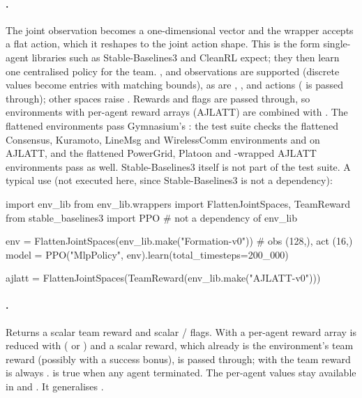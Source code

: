 \paragraph{\texorpdfstring{}{FlattenJointSpaces}.}
The joint observation becomes a one-dimensional  vector and the
wrapper accepts a flat action, which it reshapes to the joint action shape. This
is the form single-agent libraries such as Stable-Baselines3 and CleanRL
expect; they then learn one centralised policy for the team. ,
 and  observations are supported
(discrete values become  entries with matching bounds), as are
, ,  and  actions
( is passed through); other spaces raise .
Rewards and flags are passed through, so environments with per-agent reward
arrays (AJLATT) are combined with . The flattened environments
pass Gymnasium's : the test suite checks the flattened
Consensus, Kuramoto, LineMsg and WirelessComm environments and
 on AJLATT, and the flattened PowerGrid, Platoon and
-wrapped AJLATT environments pass as well. Stable-Baselines3
itself is not part of the test suite. A typical use (not executed here, since
Stable-Baselines3 is not a dependency):

\begin{pycode}
import env_lib
from env_lib.wrappers import FlattenJointSpaces, TeamReward
from stable_baselines3 import PPO          # not a dependency of env_lib

env = FlattenJointSpaces(env_lib.make("Formation-v0"))  # obs (128,), act (16,)
model = PPO("MlpPolicy", env).learn(total_timesteps=200_000)

ajlatt = FlattenJointSpaces(TeamReward(env_lib.make("AJLATT-v0")))
\end{pycode}

\paragraph{\texorpdfstring{}{TeamReward}.}
Returns a scalar team reward and scalar /
flags. With  a per-agent reward array is reduced with
 ( or ) and a scalar reward, which already
is the environment's team reward (possibly with a success bonus), is passed
through; with  the team reward is always
.  is true when any agent
terminated. The per-agent values stay available in 
and . It generalises
.

